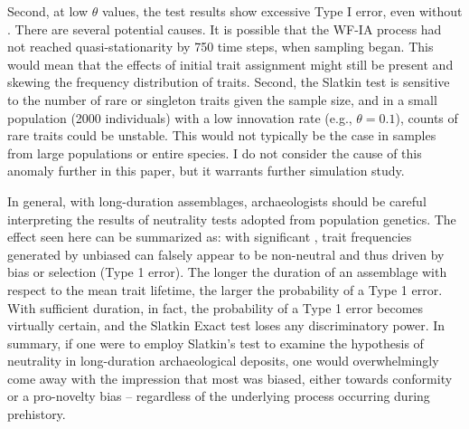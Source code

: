 Second, at low $\theta$ values, the test results show excessive Type I error, even without \timeav.  There are several potential causes.  It is possible that the WF-IA process had not reached quasi-stationarity by 750 time steps, when sampling began.  This would mean that the effects of initial trait assignment might still be present and skewing the frequency distribution of traits.  Second, the Slatkin test is sensitive to the number of rare or singleton traits given the sample size, and in a small population (2000 individuals) with a low innovation rate (e.g., $\theta = 0.1$), counts of rare traits could be unstable.  This would not typically be the case in samples from large populations or entire species.  I do not consider the cause of this anomaly further in this paper, but it warrants further simulation study.   %

In general, with long-duration assemblages, archaeologists should be careful interpreting the results of neutrality tests adopted from population genetics.  The effect seen here can be summarized as:  with significant \timeav, trait frequencies generated by unbiased \ct can falsely appear to be non-neutral and thus driven by bias or selection (Type 1 error).  The longer the duration of an assemblage with respect to the mean trait lifetime, the larger the probability of a Type 1 error.  With sufficient duration, in fact, the probability of a Type 1 error becomes virtually certain, and the Slatkin Exact test loses any discriminatory power.  In summary, if one were to employ Slatkin's test to examine the hypothesis of neutrality in long-duration archaeological deposits, one would overwhelmingly come away with the impression that most \ct was biased, either towards conformity or a pro-novelty bias -- regardless of the underlying process occurring during prehistory.  

